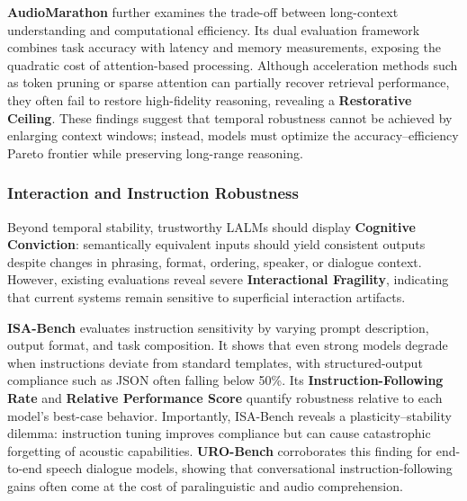 \documentclass{llmxive}
\begin{document}
\textbf{AudioMarathon} \cite{he2025audiomarathon} further examines the trade-off between long-context understanding and computational efficiency. Its dual evaluation framework combines task accuracy with latency and memory measurements, exposing the quadratic cost of attention-based processing. Although acceleration methods such as token pruning or sparse attention can partially recover retrieval performance, they often fail to restore high-fidelity reasoning, revealing a \textbf{Restorative Ceiling}. These findings suggest that temporal robustness cannot be achieved by enlarging context windows; instead, models must optimize the accuracy--efficiency Pareto frontier while preserving long-range reasoning.

\subsubsection{Interaction and Instruction Robustness}
\label{sec:5.2.2}

Beyond temporal stability, trustworthy LALMs should display \textbf{Cognitive Conviction}: semantically equivalent inputs should yield consistent outputs despite changes in phrasing, format, ordering, speaker, or dialogue context. However, existing evaluations reveal severe \textbf{Interactional Fragility}, indicating that current systems remain sensitive to superficial interaction artifacts.

\textbf{ISA-Bench} \cite{li2025isa} evaluates instruction sensitivity by varying prompt description, output format, and task composition. It shows that even strong models degrade when instructions deviate from standard templates, with structured-output compliance such as JSON often falling below 50\%. Its \textbf{Instruction-Following Rate} and \textbf{Relative Performance Score} quantify robustness relative to each model's best-case behavior. Importantly, ISA-Bench reveals a plasticity--stability dilemma: instruction tuning improves compliance but can cause catastrophic forgetting of acoustic capabilities. \textbf{URO-Bench}  \cite{yan2025uro} corroborates this finding for end-to-end speech dialogue models, showing that conversational instruction-following gains often come at the cost of paralinguistic and audio comprehension.
\end{document}
